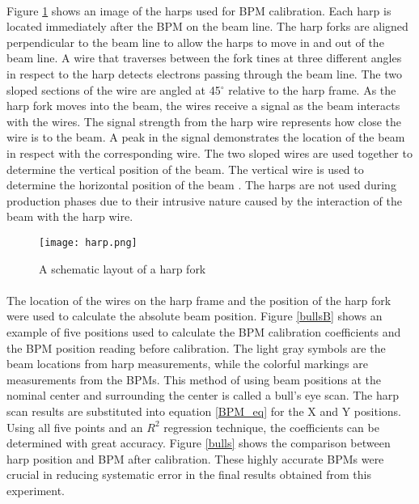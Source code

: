 \paragraph{} Figure \ref{harp} shows an image of the harps used for BPM calibration. Each harp is located immediately after the BPM on the beam line. The harp forks are aligned perpendicular to the beam line to allow the harps to move in and out of the beam line. A wire that traverses between the fork tines at three different angles in respect to the harp detects electrons passing through the beam line. The two sloped sections of the wire are angled at 45$^{\circ}$ relative to the harp frame. As the harp fork moves into the beam, the wires receive a signal as the beam interacts with the wires. The signal strength from the harp wire represents how close the wire is to the beam. A peak in the signal demonstrates the location of the beam in respect with the corresponding wire. The two sloped wires are used together to determine the vertical position of the beam. The vertical wire is used to determine the horizontal position of the beam \cite{BPM,BPM2}. The harps are not used during production phases due to their intrusive nature caused by the interaction of the beam with the harp wire.
		\begin{figure}[t]
			\centering
			\caption{A schematic layout of a harp fork \cite{BPM2} }
			\label{harp}
			\texttt{[image: harp.png]} 
		\end{figure}  	
		
		\paragraph{}The location of the wires on the harp frame and the position of the harp fork were used to calculate the absolute beam position. Figure \ref{bullsB} shows an example of five positions used to calculate the BPM calibration coefficients and the BPM position reading before calibration. The light gray symbols are the beam locations from harp measurements, while the colorful markings are measurements from the BPMs. This method of using beam positions at the nominal center and surrounding the center is called a bull's eye scan. The harp scan results are substituted into equation \ref{BPM_eq} for the X and Y positions. Using all five points and an $R^2$ regression technique, the coefficients can be determined with great accuracy. Figure \ref{bulls} shows the comparison between harp position and BPM after calibration. These highly accurate BPMs were crucial in reducing systematic error in the final results obtained from this experiment. 
